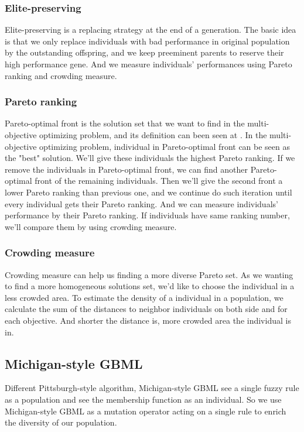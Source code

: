 \documentclass[conference]{IEEEtran}
\begin{document}
	 \subsubsection{Elite-preserving}
	 \par
	 Elite-preserving is a replacing strategy at the end of a generation. The basic idea is that we only replace individuals with bad performance in original population by the outstanding offspring, and we keep preeminent parents to reserve their high performance gene. And we measure individuals' performances using Pareto ranking and crowding measure.
	 
	 
	 \subsubsection{Pareto ranking}
	 \par
	 Pareto-optimal front is the solution set that we want to find in the multi-objective optimizing problem, and its definition can been seen at \cite{ISHIBUCHI20074}. In the multi-objective optimizing problem, individual in Pareto-optimal front can be seen as the "best" solution. We'll give these individuals the highest Pareto ranking. If we remove the individuals in Pareto-optimal front, we can find another Pareto-optimal front of the remaining individuals. Then we'll give the second front a lower Pareto ranking than previous one, and we continue do such iteration until every individual gets their Pareto ranking. And we can measure individuals' performance by their Pareto ranking. If individuals have same ranking number, we'll compare them by using crowding measure.
	 
	 \subsubsection{Crowding measure}
	 \par
	 Crowding measure can help us finding a more diverse Pareto set. As we wanting to find a more homogeneous solutions set, we'd like to choose the individual in a less crowded area. To estimate the density of a individual in a population, we calculate the sum of the distances to neighbor individuals on both side and for each objective. And shorter the distance is, more crowded area the individual is in.     
	 
	 \subsection{Michigan-style GBML}
	 \par
	 Different Pittsburgh-style algorithm, Michigan-style GBML see a single fuzzy rule as a population and see the membership function as an individual. So we use Michigan-style GBML as a mutation operator acting on a single rule to enrich the diversity of our population. 
\end{document}
